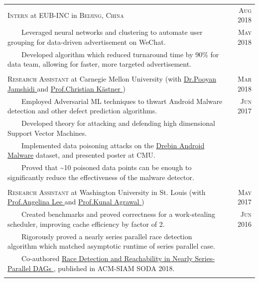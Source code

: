 \documentclass{article}
\newcommand{\tabitem}{~~\llap{\textbullet}~~}
\newcommand{\custombold}[1]{\color{subheadings}\fontspec[Path = fonts/lato/]{Lato-Reg}\selectfont #1 \normalfont}
\begin{document}
\begin{tabularx}{\textwidth}{X|r}
\large{\textsc{Intern} at \custombold{EUB-INC} in \textsc{Beijing, China}} & \textsc{Aug} 2018\\
\tabitem Leveraged neural networks and clustering to automate user grouping for data-driven advertisement on WeChat. & \textsc{May} 2018\\
\tabitem Developed algorithm which reduced turnaround time by 90\% for data team, allowing for faster, more targeted advertisement.\\
\multicolumn{2}{c}{\vspace{-5pt}} \\

\large{\textsc{Research Assistant} at \custombold{Carnegie Mellon University}} \normalsize{(with \href{https://www.cs.cmu.edu/~pjamshid/}{Dr.\custombold{Pooyan Jamshidi}} and \href{https://www.cs.cmu.edu/~ckaestne/}{Prof.\custombold{Christian Kästner}})}& \textsc{Mar} 2018\\
\tabitem Employed Adversarial ML techniques to thwart Android Malware detection and other defect prediction algorithms. & \textsc{Jun} 2017\\
\tabitem Developed theory for attacking and defending high dimensional Support Vector Machines.\\
\tabitem Implemented data poisoning attacks on the \href{https://www.sec.cs.tu-bs.de/~danarp/drebin/}{Drebin Android Malware} dataset, and presented poster at CMU. \\
\tabitem Proved that \textasciitilde 10 poisoned data points can be enough to significantly reduce the effectiveness of the malware detector.\\
\multicolumn{2}{c}{\vspace{-5pt}} \\

\large{\textsc{Research Assistant} at \custombold{Washington University in St. Louis}} \normalsize{(with \href{http://www.cse.wustl.edu/~angelee/}{Prof.\custombold{Angelina Lee}} and \href{http://www.cse.wustl.edu/~kunal/}{Prof.\custombold{Kunal Agrawal}})}& \textsc{May} 2017\\
\tabitem Created benchmarks and proved correctness for a work-stealing scheduler, improving cache efficiency by factor of 2. & \textsc{Jun} 2016\\
\tabitem Rigorously proved a nearly series parallel race detection algorithm which matched asymptotic runtime of series parallel case.\\
\tabitem Co-authored \href{https://dl.acm.org/doi/10.5555/3174304.3175277}{\custombold{Race Detection and Reachability in Nearly Series-Parallel DAGs}}, published in ACM-SIAM SODA 2018. \\
\multicolumn{2}{c}{\vspace{-5pt}} \\
\end{tabularx}
\end{document}

